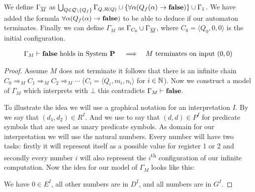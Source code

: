 We define $\Gamma_{\overline{M}}$ as $\bigcup_{Q\in\mathcal{Q}\setminus\{Q_f\}}\Gamma_{Q,R(Q)}\cup\{\forall\alpha(Q_f(\alpha)\to\textbf{false})\}\cup\Gamma_1$. We have added the formula $\forall\alpha(Q_f(\alpha)\to\textbf{false})$ to be able to deduce \false{} if our automaton terminates.
Finally we can define $\Gamma_M$ as $\Gamma_{C_0}\cup\Gamma_{\overline{M}}$, where $C_0=\langle Q_0,0,0\rangle$ is the initial configuration.
\begin{lemma}\label{cla.3.5}
	\begin{align*}
		  & \text{$\Gamma_M\vdash\textbf{false}$ holds in System \textbf{P}} &   & \implies & \text{$M$ terminates on input $(0,0)$} 
	\end{align*}
\end{lemma}
\begin{proof}
	Assume $M$ does not terminate it follows that there is an infinite chain $C_0\Rightarrow_M C_1\Rightarrow_M C_2\Rightarrow_M\cdots$ ($C_i=\langle Q_i,m_i,n_i\rangle$ for $i\in\mathbb{N}$). Now we construct a model of $\Gamma_M$ which interprets \false{} with $\bot$ this contradicts $\Gamma_M\vdash\textbf{false}$.

	To illustrate the idea we will use a graphical notation for an interpretation $I$.
	By
	we say that $(d_1,d_2)\in R^I$. And we use
	to say that $(d,d)\in P^I$ for predicate symbols that are used as unary predicate symbols. 
	As domain for our interpretation we will use the natural numbers. Every number will have two tasks: firstly it will represent itself as a possible value for register 1 or 2 and secondly every number $i$ will also represent the $i$\textsuperscript{th} configuration of our infinite computation.
	Now the idea for our model of $\Gamma_M$ looks like this:
	
	\begin{figure}[H]
		\centering
		
	\end{figure}
	We have $0\in E^I$, all other numbers are in $D^I$, and all numbers are in $G^I$.
	

\end{proof}
